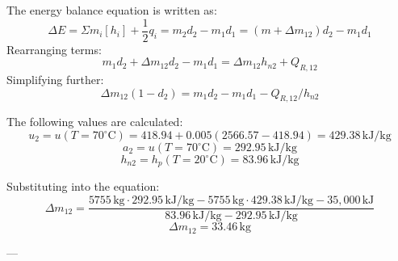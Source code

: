 The energy balance equation is written as:  
\[
\Delta E = \Sigma m_i [h_i] + \frac{1}{2} q_i = m_2 d_2 - m_1 d_1 = (m + \Delta m_{12}) d_2 - m_1 d_1
\]  
Rearranging terms:  
\[
m_1 d_2 + \Delta m_{12} d_2 - m_1 d_1 = \Delta m_{12} h_{n2} + Q_{R,12}
\]  
Simplifying further:  
\[
\Delta m_{12} (1 - d_2) = m_1 d_2 - m_1 d_1 - Q_{R,12} / h_{n2}
\]  

The following values are calculated:  
\[
u_2 = u(T=70^\circ\text{C}) = 418.94 + 0.005 (2566.57 - 418.94) = 429.38 \, \text{kJ/kg}
\]  
\[
a_2 = u(T=70^\circ\text{C}) = 292.95 \, \text{kJ/kg}
\]  
\[
h_{n2} = h_p(T=20^\circ\text{C}) = 83.96 \, \text{kJ/kg}
\]  

Substituting into the equation:  
\[
\Delta m_{12} = \frac{5755 \, \text{kg} \cdot 292.95 \, \text{kJ/kg} - 5755 \, \text{kg} \cdot 429.38 \, \text{kJ/kg} - 35,000 \, \text{kJ}}{83.96 \, \text{kJ/kg} - 292.95 \, \text{kJ/kg}}
\]  
\[
\Delta m_{12} = 33.46 \, \text{kg}
\]  

---